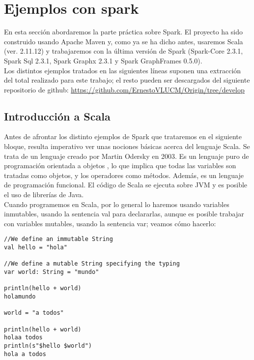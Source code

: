 \chapter{Ejemplos con spark}

En esta sección abordaremos la parte práctica sobre Spark. El proyecto ha sido construido usando Apache Maven y, como ya se ha dicho antes, usaremos Scala (ver. 2.11.12) y trabajaremos con la última versión de Spark (Spark-Core 2.3.1, Spark Sql 2.3.1, Spark Graphx 2.3.1 y Spark GraphFrames 0.5.0).\\

Los distintos ejemplos tratados en las siguientes líneas suponen una extracción del total realizado para este trabajo; el resto pueden ser descargados del siguiente repositorio de  github: \textcolor{blue}{\underline{\url{https://github.com/ErnestoVLUCM/Origin/tree/develop}}} 

\section{Introducción a Scala}

Antes de afrontar los distinto ejemplos de Spark que trataremos en el siguiente bloque, resulta imperativo ver unas nociones básicas acerca del lenguaje Scala. Se trata de un lenguaje creado por Martin Odersky en 2003. Es un lenguaje puro de programación orientada a objetos \cite{scalaCoockbook}, lo que implica que todas las variables son tratadas como objetos, y los operadores como métodos. Además, es un lenguaje de programación funcional. El código de Scala se ejecuta sobre JVM y es posible el uso de librerías de Java.\\

Cuando programemos en Scala, por lo general lo haremos usando variables inmutables, usando la sentencia val para declararlas, aunque es posible trabajar con variables mutables, usando la sentencia var; veamos cómo hacerlo:\\

\begin{lstlisting}[frame=single]
//We define an immutable String
val hello = "hola"

//We define a mutable String specifying the typing
var world: String = "mundo"

println(hello + world)
holamundo

world = "a todos"

println(hello + world)
holaa todos
println(s"$hello $world")
hola a todos
\end{lstlisting}

